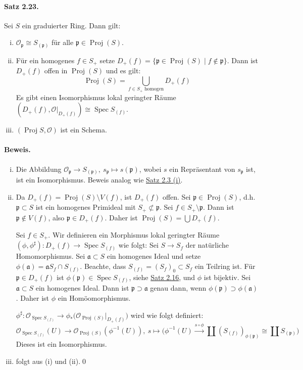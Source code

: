 \paragraph{Satz 2.23.}\label{2.23} Sei $S$ ein graduierter Ring. Dann gilt:
\begin{enumerate}[(i)]
\item $\mathcal{O}_\mathfrak{p}\cong S_{(\mathfrak{p})}$ für alle $\mathfrak{p}\in\operatorname{Proj}(S)$.
\item Für ein homogenes $f\in S_+$ setze $D_+(f)=\{\mathfrak{p}\in\operatorname{Proj}(S)\mid f\not\in\mathfrak{p}\}$. Dann ist $D_+(f)$ offen in $\operatorname{Proj}(S)$ und es gilt:
\[\operatorname{Proj}(S) =\bigcup_{f\in S_+\text{ homogen}}D_+(f) \]
Es gibt einen Isomorphismus lokal geringter Räume $(D_+(f),\mathcal{O}|_{D_+(f)})\cong\operatorname{Spec}S_{(f)}$.
\item $(\operatorname{Proj}S,\mathcal{O})$ ist ein Schema.
\end{enumerate}

\paragraph{Beweis.}\begin{enumerate}[(i)]
\item Die Abbildung $\mathcal{O}_\mathfrak{p}\to S_{(\mathfrak{p})},\ s_\mathfrak{p}\mapsto s(\mathfrak{p})$, wobei $s$ ein Repräsentant von $s_\mathfrak{p}$ ist, ist ein Isomorphismus. Beweis analog wie \hyperref[2.3]{Satz 2.3 (i)}.
\item Da $D_+(f)=\operatorname{Proj}(S)\setminus V(f)$, ist $D_+(f)$ offen. Sei $\mathfrak{p}\in\operatorname{Proj}(S)$, d.h. $\mathfrak{p}\subset S$ ist ein homogenes Primideal mit $S_+\not\subset\mathfrak{p}$. Sei $f\in S_+\setminus\mathfrak{p}$. Dann ist $\mathfrak{p}\not\in V(f)$, also $\mathfrak{p}\in D_+(f)$. Daher ist $\operatorname{Proj}(S)=\bigcup D_+(f)$.

Sei $f\in S_+$. Wir definieren ein Morphismus lokal geringter Räume $(\phi,\phi^\sharp): D_+(f)\to\operatorname{Spec}S_{(f)}$ wie folgt: Sei $S\rightarrow S_f$ der natürliche Homomorphismus. Sei $\mathfrak{a}\subset S$ ein homogenes Ideal und setze $\phi(\mathfrak{a})=\mathfrak{a}S_f\cap S_{(f)}$. Beachte, dass $S_{(f)}=(S_f)_0\subset S_f$ ein Teilring ist. Für $\mathfrak{p}\in D_+(f)$ ist $\phi(\mathfrak{p})\in\operatorname{Spec}S_{(f)}$, siehe \hyperref[2.16]{Satz 2.16}, und $\phi$ ist bijektiv. Sei $\mathfrak{a}\subset S$ ein homogenes Ideal. Dann ist $\mathfrak{p}\supset\mathfrak{a}$ genau dann, wenn $\phi(\mathfrak{p})\supset\phi(\mathfrak{a})$. Daher ist $\phi$ ein Homöomorphismus.

$\phi^\sharp:\mathcal{O}_{\operatorname{Spec} S_{(f)}}\to\phi_\ast \big(\mathcal{O}_{\operatorname{Proj}(S)}|_{D_+(f)}\big)$ wird wie folgt definiert:
\[\mathcal{O}_{\operatorname{Spec}S_{(f)}}(U)\to\mathcal{O}_{\operatorname{Proj}(S)}(\phi^{-1}(U)),\ s\mapsto \Big(\phi^{-1}(U)\stackrel{s\circ\phi}{\longrightarrow}\coprod (S_{(f)})_{\phi(\mathfrak{p})} \cong\coprod S_{(\mathfrak{p})}\Big) \]
Dieses ist ein Isomorphismus.
\item folgt aus (i) und (ii).\qed
\end{enumerate}

